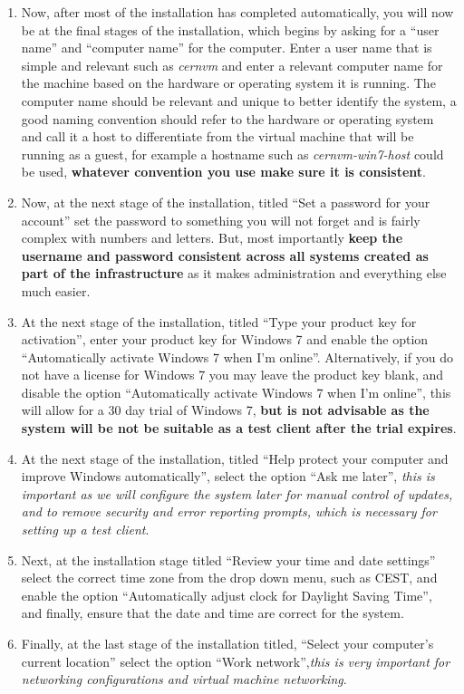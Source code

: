 \begin{enumerate}
\item	Now, after most of the installation has completed automatically, you will now be at the final stages of the installation,
		which begins by asking for a ``user name'' and ``computer name'' for the computer. Enter a user name that is simple
		and relevant such as \emph{cernvm} and enter a relevant computer name for the machine based on the hardware or operating system 
		it is running. The computer name should be relevant and unique to better identify the system, a good naming convention should refer
		to the hardware or operating system and call it a host to differentiate from the virtual machine that will be running as a guest, 
		for example a hostname such as \emph{cernvm-win7-host} could be used, {\bf whatever convention you use make sure it is consistent}.

\item	Now, at the next stage of the installation, titled ``Set a password for your account'' set the password to something
		you will not forget and is fairly complex with numbers and letters. But, most importantly {\bf keep the username and password 
		consistent across all systems created as part of the infrastructure} as it makes administration and everything else 
		much easier.
	  
\item	At the next stage of the installation, titled ``Type your product key for activation'', enter your product key for Windows 7
		and enable the option ``Automatically activate Windows 7 when I'm online''. Alternatively, if you do not have a license for
		Windows 7 you may leave the product key blank, and disable the option ``Automatically activate Windows 7 when I'm online'',
		this will allow for a 30 day trial of Windows 7, {\bf but is not advisable as the system will be not be suitable as a 
		test client after the trial expires}.
		
\item	At the next stage of the installation, titled ``Help protect your computer and improve Windows automatically'', select the option
		``Ask me later'', \emph{this is important as we will configure the system later for manual control of updates, and to remove
		security and error reporting prompts, which is necessary for setting up a test client}.
		 
\item	Next, at the installation stage titled ``Review your time and date settings'' select the correct time zone from the drop down menu,
		such as CEST, and enable the option ``Automatically adjust clock for Daylight Saving Time'', and finally, ensure that the date
		and time are correct for the system.
		

\item	Finally, at the last stage of the installation titled, ``Select your computer's current location'' select the option ``Work 
		network'',\emph{this is very important for networking configurations and virtual machine networking}.
\end{enumerate}
